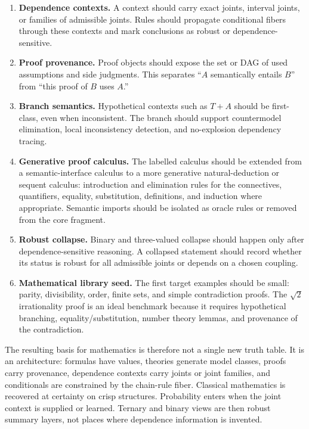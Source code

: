 \begin{enumerate}[label=(F\arabic*),leftmargin=2.5em]
\item \textbf{Dependence contexts.}  A context should carry exact joints, interval
joints, or families of admissible joints.  Rules should propagate conditional
fibers through these contexts and mark conclusions as robust or dependence-sensitive.

\item \textbf{Proof provenance.}  Proof objects should expose the set or DAG of
used assumptions and side judgments.  This separates ``$A$ semantically entails
$B$'' from ``this proof of $B$ uses $A$.''

\item \textbf{Branch semantics.}  Hypothetical contexts such as $T+A$ should be
first-class, even when inconsistent.  The branch should support countermodel
elimination, local inconsistency detection, and no-explosion dependency tracing.

\item \textbf{Generative proof calculus.}  The labelled calculus should be extended
from a semantic-interface calculus to a more generative natural-deduction or sequent
calculus: introduction and elimination rules for the connectives, quantifiers,
equality, substitution, definitions, and induction where appropriate.  Semantic
imports should be isolated as oracle rules or removed from the core fragment.

\item \textbf{Robust collapse.}  Binary and three-valued collapse should happen only
after dependence-sensitive reasoning.  A collapsed statement should record whether
its status is robust for all admissible joints or depends on a chosen coupling.

\item \textbf{Mathematical library seed.}  The first target examples should be small:
parity, divisibility, order, finite sets, and simple contradiction proofs.  The
$\sqrt2$ irrationality proof is an ideal benchmark because it requires hypothetical
branching, equality/substitution, number theory lemmas, and provenance of the
contradiction.
\end{enumerate}

The resulting basis for mathematics is therefore not a single new truth table.
It is an architecture: formulas have values, theories generate model classes,
proofs carry provenance, dependence contexts carry joints or joint families, and
conditionals are constrained by the chain-rule fiber.  Classical mathematics is
recovered at certainty on crisp structures.  Probability enters when the joint
context is supplied or learned.  Ternary and binary views are then robust summary
layers, not places where dependence information is invented.
